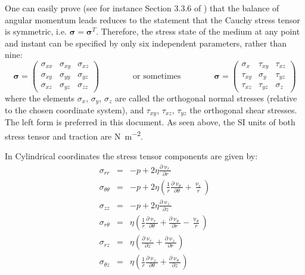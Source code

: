 One can easily prove (see for instance Section 3.3.6 of \cite{grbl09}) that the balance 
of angular momentum leads reduces to the statement that the Cauchy stress tensor 
is symmetric, i.e. ${\bm \sigma}={\bm \sigma}^T$.
Therefore, the stress state of the medium at any point and instant can be specified by only six independent parameters, rather than nine:
\begin{equation}
{\bm \sigma}=
\left(
\begin{array}{ccc}
\sigma_{xx} & \sigma_{xy} & \sigma_{xz} \\
\sigma_{xy} & \sigma_{yy} & \sigma_{yz} \\
\sigma_{xz} & \sigma_{yz} & \sigma_{zz} 
\end{array}
\right)
\qquad\qquad
\text{or sometimes}
\qquad\qquad
{\bm \sigma}=
\left(
\begin{array}{ccc}
\sigma_{x}  & \tau_{xy}  & \tau_{xz} \\
\tau_{xy}   & \sigma_{y} & \tau_{yz} \\
\tau_{xz}   & \tau_{yz}  & \sigma_{z} 
\end{array}
\right)
\end{equation}
where the elements $\sigma _{x}$, $\sigma _{y}$, $\sigma _{z}$ are called the orthogonal 
normal stresses (relative to the chosen coordinate system), and $\tau _{xy}$, $\tau _{xz}$,
$\tau _{yz}$ the orthogonal shear stresses. The left form is preferred in this document.
As seen above, the SI units of both stress tensor and traction are \si{\newton\per\square\metre}.


In Cylindrical coordinates the stress tensor components are given by:
\begin{eqnarray}
\sigma_{rr} &=& -p + 2 \eta \frac{\partial \upnu_r}{\partial r}      \\
\sigma_{\theta\theta} &=& 
 -p + 2\eta \left( \frac{1}{r} \frac{\partial \upnu_\theta}{\partial\theta} +\frac{\upnu_r}{r} \right)    \\
\sigma_{zz} &=& -p + 2 \eta \frac{\partial \upnu_z}{\partial z}      \\
\sigma_{r\theta} &=& \eta \left( \frac{1}{r} \frac{\partial \upnu_r}{\partial \theta} 
+ \frac{\partial \upnu_\theta}{\partial r} - \frac{\upnu_\theta}{r} \right)  \\
\sigma_{rz} &=& \eta \left( \frac{\partial \upnu_r}{\partial z}  + \frac{\partial \upnu_z}{\partial r}\right) \\
\sigma_{\theta z} &=&  \eta \left(  \frac{1}{r} \frac{\partial \upnu_z}{\partial \theta}
+\frac{\partial \upnu_\theta}{\partial z}     \right) 
\end{eqnarray}

